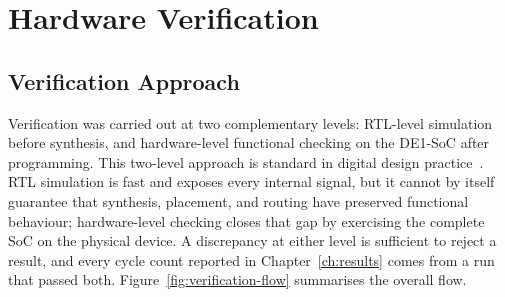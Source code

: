 \chapter{Hardware Verification}
\label{ch:methodology}

\section{Verification Approach}

Verification was carried out at two complementary levels: RTL-level
simulation before synthesis, and hardware-level functional checking on
the DE1-SoC after programming. This two-level approach is standard in
digital design practice~\citep{sze2017}. RTL simulation is fast and
exposes every internal signal, but it cannot by itself guarantee that
synthesis, placement, and routing have preserved functional behaviour;
hardware-level checking closes that gap by exercising the complete SoC
on the physical device. A discrepancy at either level is sufficient to
reject a result, and every cycle count reported in
Chapter~\ref{ch:results} comes from a run that passed both.
Figure~\ref{fig:verification-flow} summarises the overall flow.

